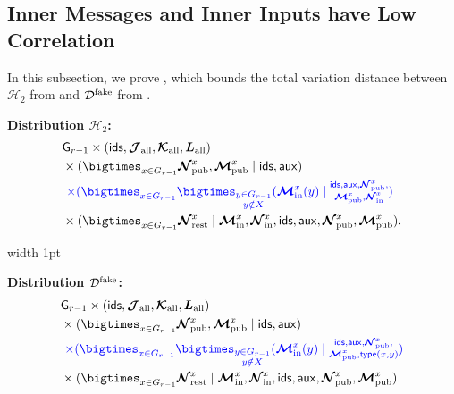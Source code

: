 \documentclass[11pt]{article}
\theoremstyle{definition}
\newcommand{\rv}[1]{\ensuremath{{\mathsf{#1}}}\xspace}
\newcommand{\rtypeval}[1]{\ensuremath{\rv{type}(#1)}}
\newcommand{\rNinner}[2]{\ensuremath{\bm{\mathcal{N}}_{\textnormal{in}}^{#1_{#2}}}}
\newcommand{\cH}{\ensuremath{\mathcal{H}}}
\newcommand{\cD}{\ensuremath{\mathcal{D}}}
\newcommand{\cDfake}{\ensuremath{\cD^{\textnormal{fake}}}}
\newcommand{\raux}{\ensuremath{\rv{aux}}}
\newcommand{\rcJall}{\ensuremath{\bm{\mathcal{J}}_{\textnormal{all}}}}
\newcommand{\rcKall}{\ensuremath{\bm{\mathcal{K}}_{\textnormal{all}}}}
\newcommand{\rLall}{\ensuremath{\bm{L}_{\textnormal{all}}}}
\newcommand{\rNpub}[1]{\ensuremath{\bm{\mathcal{N}}_{\textnormal{pub}}^{#1}}}
\newcommand{\rMpub}[1]{\ensuremath{\bm{\mathcal{M}}_{\textnormal{pub}}^{#1}}}
\newcommand{\rMinner}[1]{\ensuremath{\bm{\mathcal{M}}_{\textnormal{in}}^{#1}}}
\newcommand{\rNrest}[1]{\ensuremath{\bm{\mathcal{N}}^{#1}_{\textnormal{rest}}}}
\newcommand{\rG}{\ensuremath{\rv{G}}}
\newcommand{\rids}{\ensuremath{\rv{ids}}}
\begin{document}
\subsection{Inner Messages and Inner Inputs have Low Correlation}\label{subsec:inner-msgs}

In this subsection, we prove , which bounds the total variation distance between $\cH_2$ from  and $\cDfake$ from .

\vspace{3mm}
\hspace{-1.5em}
\begin{minipage}{0.48\textwidth}

	\small
\textbf{Distribution $\cH_2$:}
\begin{align*}
	&\rG_{r-1} \times (\rids, \rcJall, \rcKall, \rLall) \\
	&\times (\bigtimes_{x \in G_{r-1}} \rNpub{x}, \rMpub{x} \mid \rids, \raux) \\
	&~\eqcolor{\times (\bigtimes_{x \in G_{r-1}}\bigtimes_{\substack{y \in G_{r-1} \\y \notin X}} (\rMinner{x}(y) \mid  \substack{\rids, \raux, \rNpub{x},  \\ \rMpub{x}, \rNinner{x}{}})}    \\
	&\times (\bigtimes_{x \in G_{r-1}}  \rNrest{x} \mid \rMinner{x}, \rNinner{x}{}, \rids, \raux, \rNpub{x}, \rMpub{x}). 
\end{align*}
\end{minipage}
\vrule width 1pt %
\hspace{0.5em} %
\begin{minipage}{0.48\textwidth}
	\small
\textbf{Distribution $\cDfake$:}
\begin{align*}
	&\rG_{r-1} \times (\rids, \rcJall, \rcKall, \rLall)\\
	&\times (\bigtimes_{x \in G_{r-1}} \rNpub{x}, \rMpub{x} \mid \rids, \raux)\\
	&~\eqcolor{\times (\bigtimes_{x \in G_{r-1}} \bigtimes_{\substack{y \in G_{r-1} \\y \notin X}} (\rMinner{x}(y) \mid \substack{\rids,  
		\raux, \rNpub{x}, \\ \rMpub{x},  \rtypeval{x, y}})}    \\
	&\times (\bigtimes_{x \in G_{r-1}}  \rNrest{x} \mid \rMinner{x}, \rNinner{x}{}, \rids, \raux, \rNpub{x}, \rMpub{x}). 
\end{align*}
\end{minipage}
\vspace{3mm}
\end{document}
